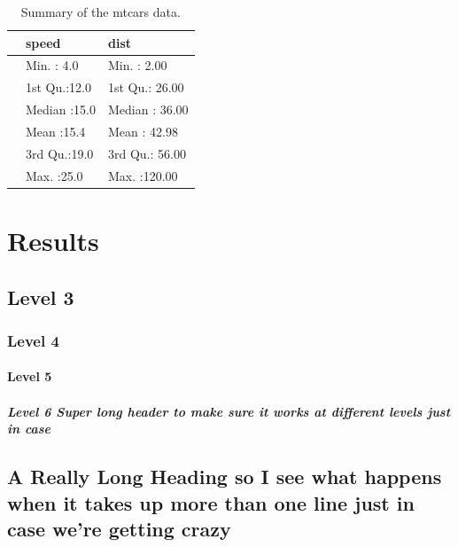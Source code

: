 \documentclass[
  10pt,
]{report}
\begin{document}
\begin{table}

\caption{\label{tab:testtable}Summary of the mtcars data.}
\centering
\begin{tabular}[t]{lll}
\toprule
  &     speed &      dist\\
\midrule
 & Min.   : 4.0 & Min.   :  2.00\\
 & 1st Qu.:12.0 & 1st Qu.: 26.00\\
 & Median :15.0 & Median : 36.00\\
 & Mean   :15.4 & Mean   : 42.98\\
 & 3rd Qu.:19.0 & 3rd Qu.: 56.00\\
\addlinespace
 & Max.   :25.0 & Max.   :120.00\\
\bottomrule
\end{tabular}
\end{table}

\hypertarget{results}{%
\section{Results}\label{results}}

\hypertarget{level-3}{%
\subsection{Level 3}\label{level-3}}

\hypertarget{level-4}{%
\subsubsection{Level 4}\label{level-4}}

\hypertarget{level-5}{%
\paragraph{Level 5}\label{level-5}}

\hypertarget{level-6-super-long-header-to-make-sure-it-works-at-different-levels-just-in-case}{%
\subparagraph{Level 6 Super long header to make sure it works at different levels just in case}\label{level-6-super-long-header-to-make-sure-it-works-at-different-levels-just-in-case}}

\hypertarget{a-really-long-heading-so-i-see-what-happens-when-it-takes-up-more-than-one-line-just-in-case-were-getting-crazy}{%
\subsection{A Really Long Heading so I see what happens when it takes up more than one line just in case we're getting crazy}\label{a-really-long-heading-so-i-see-what-happens-when-it-takes-up-more-than-one-line-just-in-case-were-getting-crazy}}
\end{document}
